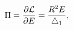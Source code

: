 \begin{equation}
\label{displace1}
\Pi = \frac{\partial {\cal L}}{\partial E} =
\frac{R^2 E}{\bigtriangleup_1},
\end{equation}

